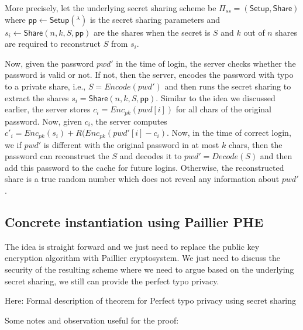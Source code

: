 More precisely, let the underlying secret sharing scheme be $ \Pi_{ss} =(\mathsf{Setup}, \mathsf{Share})$ where $ \mathsf{pp}\gets \mathsf{Setup}(^\lambda) $ is the secret sharing parameters and $ s_i \gets \mathsf{Share}(n, k, S, \mathsf{pp}) $ are the shares when the secret is $ S  $ and $ k $ out of $ n $ shares are required to reconstruct $ S $ from $ s_i $. 

Now, given the password $ pwd' $ in the time of login, the server checks whether the password is valid or not. If not, then the server, encodes the password with typo to a private share, i.e., $ S = Encode(pwd') $ and then runs the secret sharing to extract the shares $ s_i = \mathsf{Share}(n, k, S, \mathsf{pp}) $. Similar to the idea we discussed earlier, the server stores $ c_i = Enc_{pk} (pwd[i])$ for all chars of the original password. Now, given $ c_i $, the server computes $ c'_i = Enc_{pk}(s_i) + R (Enc_{pk} (pwd'[i] - c_i)$. Now, in the time of correct login, we if $ pwd' $ is different with the original password in at most $ k $ chars, then the password can reconstruct the $ S $ and decodes it to $ pwd' = Decode(S) $ and then add this password to the cache for future logins. Otherwise, the reconstructed share is a true random number which does not reveal any information about $ pwd' $. 


\subsection{Concrete instantiation using Paillier PHE}
The idea is straight forward and we just need to replace the public key encryption algorithm with Paillier cryptosystem. We just need to discuss the security of the resulting scheme where we need to argue based on the underlying secret sharing, we still can provide the perfect typo privacy. 

\begin{theorem}
	{\color{blue} Here: Formal description of theorem for Perfect typo privacy using secret sharing}
\end{theorem}

Some notes and observation useful for the proof:

